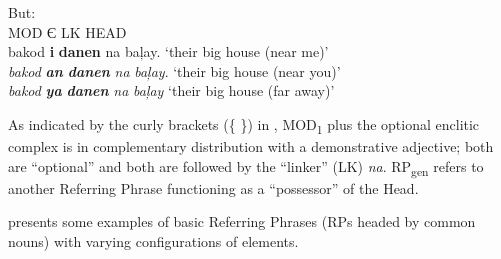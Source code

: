 \ea
But: \\
MOD \hspace{12pt}   Є \hspace{22pt}  LK  HEAD \\
\glll bakod \textbf{i} \textbf{danen} na baļay. \textnormal{‘their big  house (near me)’} \\
\textit{bakod} \textbf{\textit{an}} \textbf{\textit{danen}} \textit{na} \textit{baļay}. {‘their big house (near you)’} \\ 
\textit{bakod} \textbf{\textit{ya}} \textbf{\textit{danen}} \textit{na} \textit{baļay} {‘their big house (far away)’} \\
\glt {}
\z

As indicated by the curly brackets (\{ \}) in , MOD\textsubscript{1} plus the optional enclitic complex is in complementary distribution with a demonstrative adjective; both are “optional” and both are followed by the “linker” (LK) \textit{na}. RP\textsubscript{gen} refers to another Referring Phrase functioning as a “possessor” of the Head.

 presents some examples of basic Referring Phrases (RPs headed by common nouns) with varying configurations of elements.

